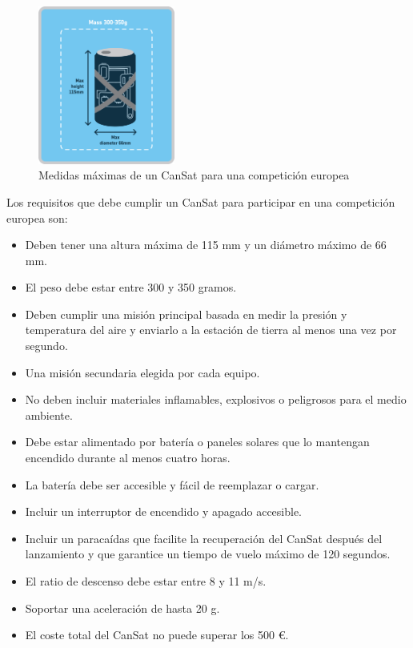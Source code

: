 \begin{figure}
    \centering
    \includegraphics[width=0.4\textwidth]{Imagenes/Bitmap/cansat_size}
    \caption{Medidas máximas de un CanSat para una competición europea}
    \label{fig:cansat_Size}
\end{figure}

Los requisitos que debe cumplir un CanSat para participar en una competición europea son:
\begin{itemize}
    \item Deben tener una altura máxima de 115 mm y un diámetro máximo de 66 mm.
    \item El peso debe estar entre 300 y 350 gramos.
    \item Deben cumplir una misión principal basada en medir la presión y temperatura del aire y enviarlo a la estación de tierra al menos una vez por segundo.
    \item Una misión secundaria elegida por cada equipo.
    \item No deben incluir materiales inflamables, explosivos o peligrosos para el medio ambiente.
    \item Debe estar alimentado por batería o paneles solares que lo mantengan encendido durante al menos cuatro horas.
    \item La batería debe ser accesible y fácil de reemplazar o cargar.
    \item Incluir un interruptor de encendido y apagado accesible.
    \item Incluir un paracaídas que facilite la recuperación del CanSat después del lanzamiento y que garantice un tiempo de vuelo máximo de 120 segundos.
    \item El ratio de descenso debe estar entre 8 y 11 m/s.
    \item Soportar una aceleración de hasta 20 g.
    \item El coste total del CanSat no puede superar los 500 €.
\end{itemize}


